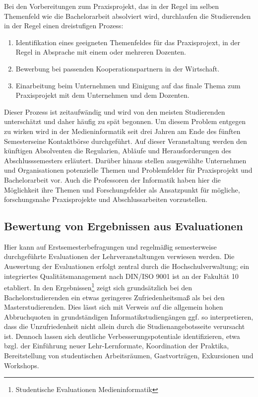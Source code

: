 Bei den Vorbereitungen zum Praxisprojekt, das in der Regel im selben
Themenfeld wie die Bachelorarbeit absolviert wird, durchlaufen die
Studierenden in der Regel einen dreistufigen Prozess:

\begin{enumerate}
\def\labelenumi{\arabic{enumi}.}
\tightlist
\item
  Identifikation eines geeigneten Themenfeldes für das Praxisprojext, in
  der Regel in Absprache mit einem oder mehreren Dozenten.
\item
  Bewerbung bei passenden Kooperationspartnern in der Wirtschaft.
\item
  Einarbeitung beim Unternehmen und Einigung auf das finale Thema zum
  Praxisprojekt mit dem Unternehmen und dem Dozenten.
\end{enumerate}

Dieser Prozess ist zeitaufwändig und wird von den meisten Studierenden
unterschätzt und daher häufig zu spät begonnen. Um diesem Problem
entgegen zu wirken wird in der Medieninformatik seit drei Jahren am Ende
des fünften Semesterseine Kontaktbörse durchgeführt. Auf dieser
Veranstaltung werden den künftigen Absolventen die Regularien, Abläufe
und Herausforderungen des Abschlusssemesters erläutert. Darüber hinaus
stellen ausgewählte Unternehmen und Organisationen potenzielle Themen
und Problemfelder für Praxisprojekt und Bachelorarbeit vor. Auch die
Professoren der Informatik haben hier die Möglichkeit ihre Themen und
Forschungsfelder als Ansatzpunkt für mögliche, forschungsnahe
Praxisprojekte und Abschlussarbeiten vorzustellen.

\subsection{Bewertung von Ergebnissen aus
Evaluationen}\label{bewertung-von-ergebnissen-aus-evaluationen}

Hier kann auf Erstsemesterbefragungen und regelmäßig semesterweise
durchgeführte Evaluationen der Lehrveranstaltungen verwiesen werden. Die
Auswertung der Evaluationen erfolgt zentral durch die
Hochschulverwaltung; ein integriertes Qualitätsmanagement nach DIN/ISO
9001 ist an der Fakultät 10 etabliert. In den Ergebnissen\footnote{Studentische
  Evaluationen Medieninformatik} zeigt sich grundsätzlich bei den
Bachelorstudierenden ein etwas geringeres Zufriedenheitsmaß als bei den
Masterstudierenden. Dies lässt sich mit Verweis auf die allgemein hohen
Abbruchquoten in grundständigen Informatikstudiengängen ggf. so
interpretieren, dass die Unzufriedenheit nicht allein durch die
Studienangebotsseite verursacht ist. Dennoch lassen sich deutliche
Verbesserungspotentiale identifizieren, etwa bzgl. der Einführung neuer
Lehr-Lernformate, Koordination der Praktika, Bereitstellung von
studentischen Arbeitsräumen, Gastvorträgen, Exkursionen und Workshops.

